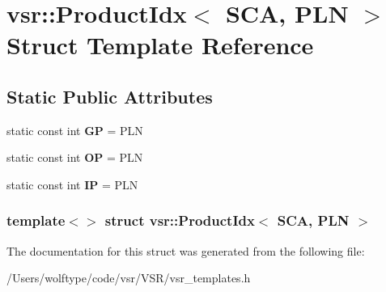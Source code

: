 \hypertarget{structvsr_1_1_product_idx_3_01_s_c_a_00_01_p_l_n_01_4}{\section{vsr\-:\-:Product\-Idx$<$ S\-C\-A, P\-L\-N $>$ Struct Template Reference}
\label{structvsr_1_1_product_idx_3_01_s_c_a_00_01_p_l_n_01_4}
}
\subsection*{Static Public Attributes}
\begin{DoxyCompactItemize}
\item 
\hypertarget{structvsr_1_1_product_idx_3_01_s_c_a_00_01_p_l_n_01_4_abc84b55a6b17ccf4b488765663ec5ae9}{static const int {\bfseries G\-P} = P\-L\-N}\label{structvsr_1_1_product_idx_3_01_s_c_a_00_01_p_l_n_01_4_abc84b55a6b17ccf4b488765663ec5ae9}

\item 
\hypertarget{structvsr_1_1_product_idx_3_01_s_c_a_00_01_p_l_n_01_4_a79888b96a3695364343529d1ea36c9f0}{static const int {\bfseries O\-P} = P\-L\-N}\label{structvsr_1_1_product_idx_3_01_s_c_a_00_01_p_l_n_01_4_a79888b96a3695364343529d1ea36c9f0}

\item 
\hypertarget{structvsr_1_1_product_idx_3_01_s_c_a_00_01_p_l_n_01_4_aec673aa697ca6b1158fc760e2a137557}{static const int {\bfseries I\-P} = P\-L\-N}\label{structvsr_1_1_product_idx_3_01_s_c_a_00_01_p_l_n_01_4_aec673aa697ca6b1158fc760e2a137557}

\end{DoxyCompactItemize}
\subsubsection*{template$<$$>$ struct vsr\-::\-Product\-Idx$<$ S\-C\-A, P\-L\-N $>$}



The documentation for this struct was generated from the following file\-:\begin{DoxyCompactItemize}
\item 
/\-Users/wolftype/code/vsr/\-V\-S\-R/vsr\-\_\-templates.\-h\end{DoxyCompactItemize}
